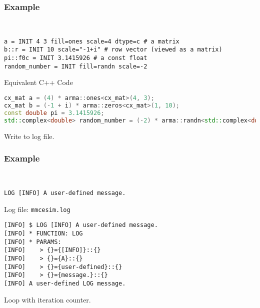 \subsubsection*{Example}
\begin{example}~
  \begin{lstlisting}[language=mmcesim-sim]
a = INIT 4 3 fill=ones scale=4 dtype=c # a matrix
b::r = INIT 10 scale="-1+i" # row vector (viewed as a matrix)
pi::f0c = INIT 3.1415926 # a const float
random_number = INIT fill=randn scale=-2
  \end{lstlisting}
  Equivalent C++ Code
  \begin{lstlisting}[language=c++]
cx_mat a = (4) * arma::ones<cx_mat>(4, 3);
cx_mat b = (-1 + i) * arma::zeros<cx_mat>(1, 10);
const double pi = 3.1415926;
std::complex<double> random_number = (-2) * arma::randn<std::complex<double>>();
  \end{lstlisting}
\end{example}

Write to log file.
\subsubsection*{Example}
\begin{example}~
  \begin{lstlisting}[language=mmcesim-sim]
LOG [INFO] A user-defined message.
  \end{lstlisting}
  Log file: \texttt{mmcesim.log}
  \begin{lstlisting}[]
[INFO] $ LOG [INFO] A user-defined message.
[INFO] * FUNCTION: LOG
[INFO] * PARAMS:
[INFO]    > {}={[INFO]}::{}
[INFO]    > {}={A}::{}
[INFO]    > {}={user-defined}::{}
[INFO]    > {}={message.}::{}
[INFO] A user-defined LOG message.
  \end{lstlisting}
\end{example}

Loop with iteration counter.
